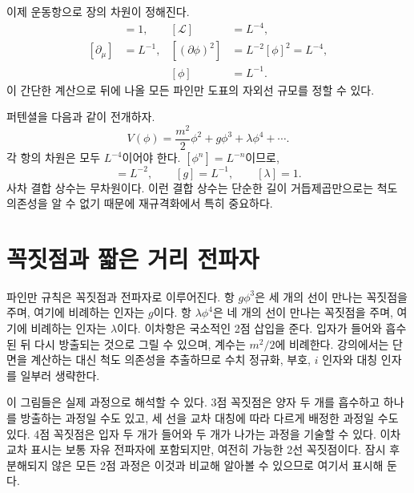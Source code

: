 이제 운동항으로 장의 차원이 정해진다.
\begin{align}
[S]&=1, & [\mathcal L]&=L^{-4},\\
[\partial_\mu]&=L^{-1}, &
[(\partial\phi)^2]&=L^{-2}[\phi]^2=L^{-4},\nonumber\\
&& [\phi]&=L^{-1}.
\label{eq:scalar-dimension}
\end{align}
이 간단한 계산으로 뒤에 나올 모든 파인만 도표의 자외선 규모를 정할 수 있다.

퍼텐셜을 다음과 같이 전개하자.
\begin{equation}
V(\phi)=\frac{m^2}{2}\phi^2+g\phi^3+\lambda\phi^4+\cdots.
\label{eq:scalar-potential}
\end{equation}
각 항의 차원은 모두 \(L^{-4}\)이어야 한다. \([\phi^n]=L^{-n}\)이므로,
\begin{equation}
[m^2]=L^{-2},
\qquad
[g]=L^{-1},
\qquad
[\lambda]=1.
\label{eq:coupling-dimensions}
\end{equation}
사차 결합 상수는 무차원이다. 이런 결합 상수는 단순한 길이 거듭제곱만으로는 척도 의존성을 알 수 없기 때문에 재규격화에서 특히 중요하다.

\begin{classroomqa}
\end{classroomqa}

\section{꼭짓점과 짧은 거리 전파자}

파인만 규칙은 꼭짓점과 전파자로 이루어진다. 항 \(g\phi^3\)은 세 개의 선이 만나는 꼭짓점을 주며, 여기에 비례하는 인자는 \(g\)이다. 항 \(\lambda\phi^4\)은 네 개의 선이 만나는 꼭짓점을 주며, 여기에 비례하는 인자는 \(\lambda\)이다. 이차항은 국소적인 2점 삽입을 준다. 입자가 들어와 흡수된 뒤 다시 방출되는 것으로 그릴 수 있으며, 계수는 \(m^2/2\)에 비례한다. 강의에서는 단면을 계산하는 대신 척도 의존성을 추출하므로 수치 정규화, 부호, \(i\) 인자와 대칭 인자를 일부러 생략한다.

이 그림들은 실제 과정으로 해석할 수 있다. 3점 꼭짓점은 양자 두 개를 흡수하고 하나를 방출하는 과정일 수도 있고, 세 선을 교차 대칭에 따라 다르게 배정한 과정일 수도 있다. 4점 꼭짓점은 입자 두 개가 들어와 두 개가 나가는 과정을 기술할 수 있다. 이차 교차 표시는 보통 자유 전파자에 포함되지만, 여전히 가능한 2선 꼭짓점이다. 잠시 후 분해되지 않은 모든 2점 과정은 이것과 비교해 알아볼 수 있으므로 여기서 표시해 둔다.

